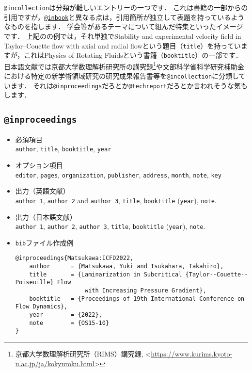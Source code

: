 \documentclass[a4paper,fleqn,uplatex,dvipdfmx]{jsarticle}
\makeatletter
\newcommand{\ttinbook}{\texttt{@inbook}}
\newcommand{\ttincollection}{\texttt{@incollection}}
\newcommand{\ttinproceedings}{\texttt{@inproceedings}}
\newcommand{\tttechreport}{\texttt{@techreport}}
\makeatother
\begin{document}
\ttincollection は分類が難しいエントリーの一つです．
これは書籍の一部からの引用ですが，\hyperref[ssec:inbook]{\ttinbook}と異なる点は，引用箇所が独立して表題を持っているようなものを指します．
学会等があるテーマについて組んだ特集といったイメージです．
上記の\citet{Lueptow:Springer2000}の例では，それ単独でStability and experimental velocity field in Taylor--Couette flow with axial and radial flowという題目（\verb|title|）を持っていますが，これはPhysics of Rotating Fluidsという書籍（\verb|booktitle|）の一部です．
日本語文献では京都大学数理解析研究所の講究録\footnote{京都大学数理解析研究所（RIMS）講究録, \textless\url{https://www.kurims.kyoto-u.ac.jp/ja/kokyuroku.html}\textgreater}や文部科学省科学研究補助金における特定の新学術領域研究の研究成果報告書等を\ttincollection に分類しています．
それは\hyperref[ssec:inproceedings]{\ttinproceedings}だろとか\hyperref[ssec:techreport]{\tttechreport}だろとか言われそうな気もします．

\subsection{\ttinproceedings}
\label{ssec:inproceedings}
\begin{screen}
    \begin{itemize}
        \item 必須項目 \\
        \verb|author|, \verb|title|, \verb|booktitle|, \verb|year|
        \item オプション項目 \\
        \verb|editor|, \verb|pages|, \verb|organization|, \verb|publisher|, \verb|address|, \verb|month|, \verb|note|, \verb|key|
        \item 出力（英語文献） \\
            \colorbox[gray]{0.8}{\texttt{author 1}}, \colorbox[gray]{0.8}{\texttt{author 2}} and \colorbox[gray]{0.8}{\texttt{author 3}}, \colorbox[gray]{0.8}{\texttt{title}}, \colorbox[gray]{0.8}{\texttt{booktitle}} (\colorbox[gray]{0.8}{\texttt{year}}), \colorbox[gray]{0.8}{\texttt{note}}.
        \item 出力（日本語文献） \\
            \colorbox[gray]{0.8}{\texttt{author 1}}, \colorbox[gray]{0.8}{\texttt{author 2}}, \colorbox[gray]{0.8}{\texttt{author 3}}, \colorbox[gray]{0.8}{\texttt{title}}, \colorbox[gray]{0.8}{\texttt{booktitle}} (\colorbox[gray]{0.8}{\texttt{year}}), \colorbox[gray]{0.8}{\texttt{note}}.
        \item \verb|bib|ファイル作成例 \vspace{-3mm}
\begin{verbatim}
@inproceedings{Matsukawa:ICFD2022,
    author      = {Matsukawa, Yuki and Tsukahara, Takahiro},
    title       = {Laminarization in Subcritical {Taylor--Couette--Poiseuille} Flow 
                    with Increasing Pressure Gradient},
    booktitle   = {Proceedings of 19th International Conference on Flow Dynamics},
    year        = {2022},
    note        = {OS15-10}
}
\end{verbatim}
    \end{itemize}
\end{screen}
\end{document}
